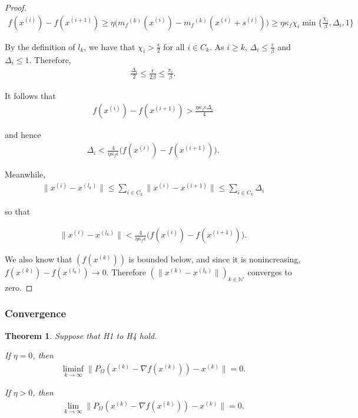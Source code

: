 \documentclass{article}
\newtheorem{theorem}{Theorem}[section]
\theoremstyle{case}
\newcommand{\modelk}{{{m}_f}^{(k)}}
\newcommand{\iteratek}{{x}^{(k)}}
\newcommand{\ints}{\mathbb N}
\newcommand{\grad}{\nabla f}
\begin{document}
\begin{proof}
\begin{align}
f(x^{(i)}) - f(x^{(i+1)}) \ge \eta\big ( \modelk(x^{(i)}) - \modelk(x^{(i)} + s^{(i)}) \big ) \ge \eta \kappa_f \chi_i \min\{\frac{\chi_{i}}{\beta}, \Delta_i, 1\} 
\end{align}

By the definition of $l_k$, we have that $\chi_i > \frac{\epsilon}{2}$ for all $i \in C_k$.
As $i \ge k$, $\Delta_i \le \frac{\epsilon}{\beta}$ and $\Delta_i \le 1$.
Therefore,
\begin{align}
\frac{\Delta_i}{2} \le \frac{\epsilon}{2\beta} \le \frac{\pi_i}{\beta}.
\end{align}

It follows that
\begin{align}
f(x^{(i)}) - f(x^{(i+1)}) > \frac{\eta \kappa_f \epsilon \Delta_i}{4}
\end{align}

and hence
\begin{align}
\Delta_i < \frac{4}{\eta \kappa_f \epsilon} \big ( f(x^{(i)}) - f(x^{(i+1)})\big ).
\end{align}

Meanwhile,
\begin{align}
\|x^{(i)} - x^{(l_k)}\| \le \sum_{i \in C_k}\|x^{(i)} - x^{(i+1)}\| \le \sum_{i \in C_k} \Delta_i
\end{align}

so that

\begin{align}
\|x^{(i)} - x^{(l_k)}\| < \frac{4}{\eta \kappa_f \epsilon} \big ( f(x^{(i)}) - f(x^{(i+1)})\big ).
\end{align}

We also know that $(f(\iteratek))$ is bounded below, and since it is nonincreasing, $f(\iteratek)  - f(x^{(l_k)}) \to 0$.
Therefore $(\|\iteratek - x^{(l_k)}\|)_{k \in \ints '}$ converges to zero.

\end{proof}

\subsubsection{Convergence}

\begin{theorem}
Suppose that H1 to H4 hold.

If $\eta = 0$, then
\begin{align}
\liminf_{k\to\infty} \|P_{\Omega}(\iteratek - \grad(\iteratek)) - \iteratek \| = 0.
\end{align}

If $\eta > 0$, then
\begin{align}
\lim_{k\to\infty} \|P_{\Omega}(\iteratek - \grad(\iteratek)) - \iteratek \| = 0.
\end{align}

\end{theorem}
\end{document}
